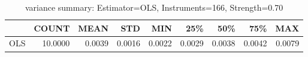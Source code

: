 \begin{table}[ht]
\centering
\caption{variance summary: Estimator=OLS, Instruments=166, Strength=0.70}
\begin{tabular}{lrrrrrrrr}
\toprule
 & COUNT & MEAN & STD & MIN & 25\% & 50\% & 75\% & MAX \\
\midrule
OLS & 10.0000 & 0.0039 & 0.0016 & 0.0022 & 0.0029 & 0.0038 & 0.0042 & 0.0079 \\
\bottomrule
\end{tabular}
\end{table}
